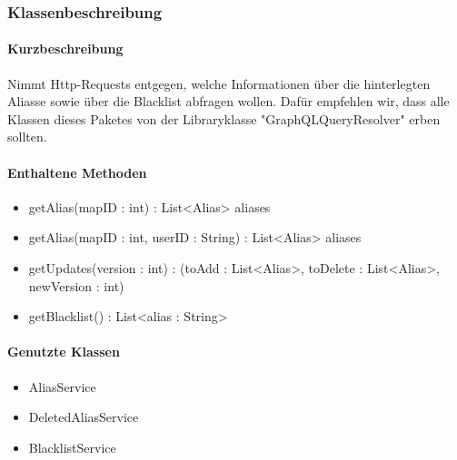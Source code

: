 \subsubsection*{Klassenbeschreibung}%
\paragraph*{Kurzbeschreibung}
Nimmt Http-Requests entgegen, welche Informationen über die hinterlegten Aliasse sowie über die Blacklist abfragen wollen.
Dafür empfehlen wir, dass alle Klassen dieses Paketes von der Libraryklasse "GraphQLQueryResolver" erben sollten.
\paragraph*{Enthaltene Methoden}
\begin{itemize}
    \item getAlias(mapID : int) : List<Alias> aliases
    \item getAlias(mapID : int, userID : String) : List<Alias> aliases
    \item getUpdates(version : int) : (toAdd : List<Alias>, toDelete : List<Alias>, newVersion : int)
    \item getBlacklist() : List<alias : String>
\end{itemize}
\paragraph*{Genutzte Klassen}
\begin{itemize}
    \item AliasService
    \item DeletedAliasService
    \item BlacklistService
\end{itemize}